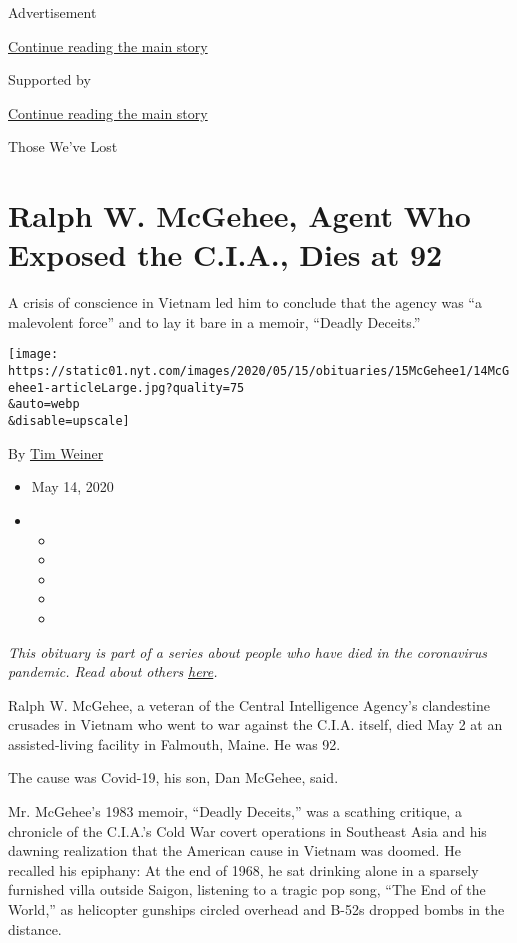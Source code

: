 Advertisement

\protect\hyperlink{after-top}{Continue reading the main story}

Supported by

\protect\hyperlink{after-sponsor}{Continue reading the main story}

Those We've Lost

\hypertarget{ralph-w-mcgehee-agent-who-exposed-the-cia-dies-at-92}{%
\section{Ralph W. McGehee, Agent Who Exposed the C.I.A., Dies at
92}\label{ralph-w-mcgehee-agent-who-exposed-the-cia-dies-at-92}}

A crisis of conscience in Vietnam led him to conclude that the agency
was ``a malevolent force'' and to lay it bare in a memoir, ``Deadly
Deceits.''

\texttt{[image: https://static01.nyt.com/images/2020/05/15/obituaries/15McGehee1/14McGehee1-articleLarge.jpg?quality=75\\\&auto=webp\\\&disable=upscale]}

By \href{https://www.nytimes.com/by/tim-weiner}{Tim Weiner}

\begin{itemize}
\item
  May 14, 2020
\item
  \begin{itemize}
  \item
  \item
  \item
  \item
  \item
  \end{itemize}
\end{itemize}

\emph{This obituary is part of a series about people who have died in
the coronavirus pandemic. Read about others}
\href{https://www.nytimes.com/series/people-who-have-died-of-the-coronavirus}{\emph{here}}\emph{.}

Ralph W. McGehee, a veteran of the Central Intelligence Agency's
clandestine crusades in Vietnam who went to war against the C.I.A.
itself, died May 2 at an assisted-living facility in Falmouth, Maine. He
was 92.

The cause was Covid-19, his son, Dan McGehee, said.

Mr. McGehee's 1983 memoir, ``Deadly Deceits,'' was a scathing critique,
a chronicle of the C.I.A.'s Cold War covert operations in Southeast Asia
and his dawning realization that the American cause in Vietnam was
doomed. He recalled his epiphany: At the end of 1968, he sat drinking
alone in a sparsely furnished villa outside Saigon, listening to a
tragic pop song, ``The End of the World,'' as helicopter gunships
circled overhead and B-52s dropped bombs in the distance.

